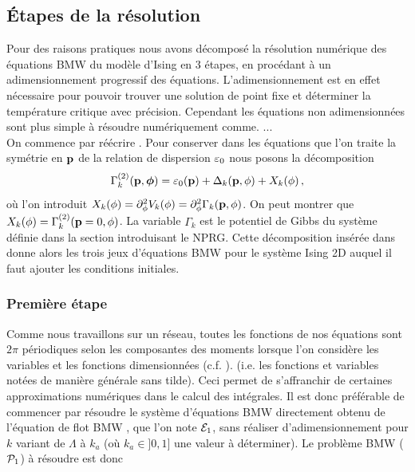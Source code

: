 \documentclass[10.5pt]{article}
\begin{document}
\begin{multicols}{2}
\subsection{Étapes de la résolution}

Pour des raisons pratiques nous avons décomposé la résolution numérique des équations BMW du modèle d'Ising en 3 étapes, en procédant à un adimensionnement progressif des équations. L'adimensionnement est en effet nécessaire pour pouvoir trouver une solution de point fixe et déterminer la température critique avec précision. Cependant les équations non adimensionnées sont plus simple à résoudre numériquement comme. ...\\

On commence par réécrire . Pour conserver dans les équations que l'on traite la symétrie en ${\bf p}$ de la relation de dispersion $\varepsilon_0$ nous posons la décomposition 
\begin{equation}
\Gamma_k^{(2)}({\bf p}, \boldsymbol{ \phi}) = \varepsilon_0({\bf p}) + \Delta_k({\bf p}, \phi) + X_k(\phi) \, ,
\label{eq:decompBMWIsing2D}
\end{equation} 
où l'on introduit $X_k(\phi) = \partial_{\phi}^2 V_k(\phi) = \partial_{\phi}^2 \Gamma_k({\bf p}, \phi)$. On peut montrer que $X_k(\phi) = \Gamma^{(2)}_k({\bf p}=0, \phi)$. La variable $\Gamma_k$ est le potentiel de Gibbs du système définie dans la section introduisant le NPRG. Cette décomposition insérée dans  donne alors les trois jeux d'équations BMW pour le système Ising 2D auquel il faut ajouter les conditions initiales.



\subsubsection{Première étape}

Comme nous travaillons sur un réseau, toutes les fonctions de nos équations sont $2\pi$ périodiques selon les composantes des moments lorsque l'on considère les variables et les fonctions dimensionnées (c.f. ). (i.e. les fonctions et variables notées de manière générale sans tilde). Ceci permet de s'affranchir de certaines approximations numériques dans le calcul des intégrales. Il est donc préférable de commencer par résoudre le système d'équations BMW directement obtenu de l'équation de flot BMW , que l'on note $\mathcal{E}_1$, sans réaliser d'adimensionnement pour $k $ variant de $\Lambda$ à $k_a$ (où $k_a \in ]0, 1]$ une valeur à déterminer). Le problème BMW ($\mathcal{P}_1$) à résoudre est donc \\


\end{multicols}
\end{document}
